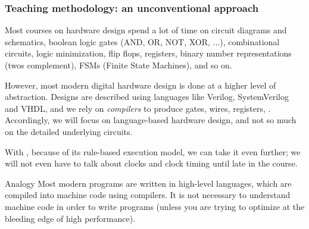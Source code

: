 \begin{frame}
\frametitle{Teaching methodology: an unconventional approach}

\footnotesize

Most courses on hardware design spend a lot of time on
circuit diagrams and schematics, boolean logic gates (AND, OR, NOT,
XOR, ...), combinational circuits, logic minimization, flip flops,
registers, binary number representations (twos complement), FSMs
(Finite State Machines), and so on.

\vspace{1ex}

However, most modern digital hardware design is done at a higher level
of abstraction.  Designs are described using languages like Verilog,
SystemVerilog and VHDL, and we rely on \emph{compilers} to produce
gates, wires, registers, {\etc}.  Accordingly, we will focus on
language-based hardware design, and not so much on the detailed
underlying circuits.

\vspace{1ex}

With {\BSV}, because of its rule-based execution model, we can take it
even further; we will not even have to talk about clocks and clock
timing until late in the course.

\vspace*{5ex}

\footnotesize

\begin{block}{Analogy}
Most modern programs are written in high-level languages, which are
compiled into machine code using compilers.  It is not necessary to
understand machine code in order to write programs (unless you are
trying to optimize at the bleeding edge of high performance).

\end{block}

\end{frame}


